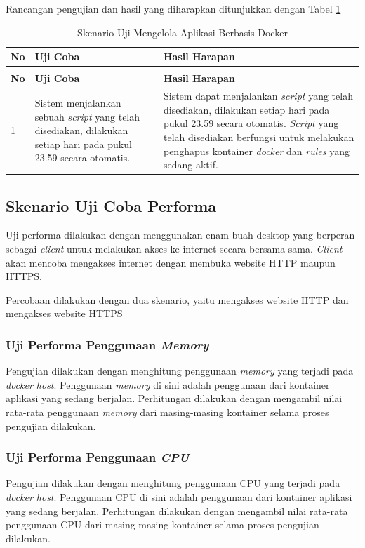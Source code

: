 Rancangan pengujian dan hasil yang diharapkan ditunjukkan dengan Tabel \ref{scheduledocker}
\begin{longtable}{|p{}|p{}|p{}|}					\caption{Skenario Uji \textit{Schedule} pada \textit{Docker Host}} \label{scheduledocker} \\
	\hline
	\textbf{No} & \textbf{Uji Coba} & \textbf{Hasil Harapan} \\ \hline
	\endfirsthead
	\caption[]{Skenario Uji Mengelola Aplikasi Berbasis Docker} \\
	\hline
	\textbf{No} & \textbf{Uji Coba} & \textbf{Hasil Harapan} \\ \hline
	\endhead
	\endfoot
	\endlastfoot
	
	1 & Sistem menjalankan sebuah \textit{script} yang telah disediakan, dilakukan setiap hari pada pukul 23.59 secara otomatis. & Sistem dapat menjalankan \textit{script} yang telah disediakan, dilakukan setiap hari pada pukul 23.59 secara otomatis. \textit{Script} yang telah disediakan berfungsi untuk melakukan penghapus kontainer \textit{docker} dan \textit{rules} yang sedang aktif. \\ \hline
\end{longtable}

\subsection{Skenario Uji Coba Performa}
Uji performa dilakukan dengan menggunakan enam buah desktop yang berperan sebagai \textit{client} untuk melakukan akses ke internet secara bersama-sama. \textit{Client} akan mencoba mengakses internet dengan membuka website HTTP maupun HTTPS.

Percobaan dilakukan dengan dua skenario, yaitu mengakses website HTTP dan mengakses website HTTPS

\subsubsection{Uji Performa Penggunaan \textit{Memory}}
Pengujian dilakukan dengan menghitung penggunaan \textit{memory} yang terjadi pada \textit{docker host}. Penggunaan \textit{memory} di sini adalah penggunaan dari kontainer aplikasi yang sedang berjalan. Perhitungan dilakukan dengan mengambil nilai rata-rata penggunaan \textit{memory} dari masing-masing kontainer selama proses pengujian dilakukan.

\subsubsection{Uji Performa Penggunaan \textit{CPU}}
Pengujian dilakukan dengan menghitung penggunaan CPU yang terjadi pada \textit{docker host}. Penggunaan CPU di sini adalah penggunaan dari kontainer aplikasi yang sedang berjalan. Perhitungan dilakukan dengan mengambil nilai rata-rata penggunaan CPU dari masing-masing kontainer selama proses pengujian dilakukan.

